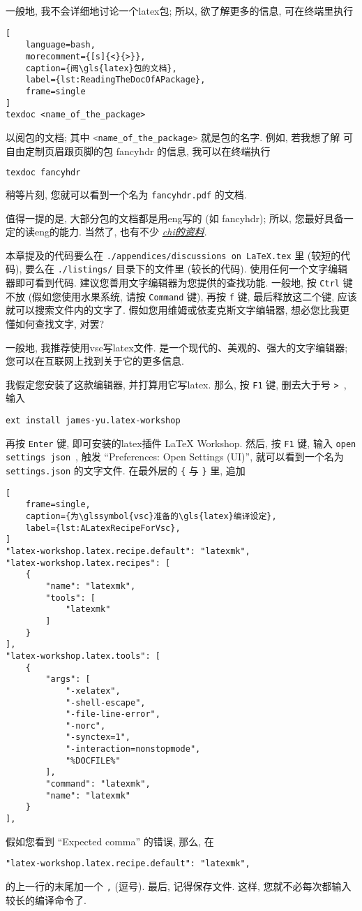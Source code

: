 一般地, 我不会详细地讨论一个\gls{latex}包;
所以, 欲了解更多的信息, 可在终端里执行
\begin{lstlisting}[
    language=bash,
    morecomment={[s]{<}{>}},
    caption={阅\gls{latex}包的文档},
    label={lst:ReadingTheDocOfAPackage},
    frame=single
]
texdoc <name_of_the_package>
\end{lstlisting}
以阅包的文档;
其中
\lstinline[language=bash,morecomment={[s]{<}{>}}]`<name_of_the_package>`
就是包的名字.
例如,
若我想了解%
可自由定制页眉跟页脚的包 \textsf{fancyhdr} 的信息,
我可以在终端执行
\begin{lstlisting}[language=bash,morecomment={[s]{<}{>}}]
texdoc fancyhdr
\end{lstlisting}
稍等片刻, 您就可以看到一个名为 \verb`fancyhdr.pdf` 的文档.

值得一提的是,
大部分包的文档都是用\gls{eng}写的 (如 \textsf{fancyhdr});
所以, 您最好具备一定的读\gls{eng}的能力.
当然了, 也有不少%
\href{https://ctan.org/topic/chinese-doc}{\emph{\gls{chi}的资料}}.

本章提及的代码要么在
\verb`./appendices/discussions on LaTeX.tex` 里 (较短的代码),
要么在 \verb`./listings/` 目录下的文件里 (较长的代码).
使用任何一个文字编辑器即可看到代码.
建议您善用文字编辑器为您提供的查找功能.
一般地, 按 \verb`Ctrl` 键不放
(假如您使用水果系统, 请按 \verb`Command` 键),
再按 \verb`f` 键, 最后释放这二个键,
应该就可以搜索文件内的文字了.
假如您用维姆或依麦克斯文字编辑器,
想必您比我更懂如何查找文字, 对罢?

一般地, 我推荐使用\gls{vsc}写\gls{latex}文件.
是一个现代的、美观的、强大的文字编辑器;
您可以在互联网上找到关于它的更多信息.

我假定您安装了这款编辑器, 并打算用它写\gls{latex}.
那么, 按 \verb`F1` 键, 删去大于号 \verb`>`~, 输入
\begin{lstlisting}
ext install james-yu.latex-workshop
\end{lstlisting}
再按 \verb`Enter` 键,
即可安装的\gls{latex}插件 LaTeX Workshop.
然后, 按 \verb`F1` 键, 输入 \verb`open settings json`~,
触发 ``Preferences: Open Settings (UI)'',
就可以看到一个名为 \verb`settings.json` 的文字文件.
在最外层的 \verb`{` 与 \verb`}` 里, 追加
\begin{lstlisting}[
    frame=single,
    caption={为\glssymbol{vsc}准备的\gls{latex}编译设定},
    label={lst:ALatexRecipeForVsc},
]
"latex-workshop.latex.recipe.default": "latexmk",
"latex-workshop.latex.recipes": [
    {
        "name": "latexmk",
        "tools": [
            "latexmk"
        ]
    }
],
"latex-workshop.latex.tools": [
    {
        "args": [
            "-xelatex",
            "-shell-escape",
            "-file-line-error",
            "-norc",
            "-synctex=1",
            "-interaction=nonstopmode",
            "%DOCFILE%"
        ],
        "command": "latexmk",
        "name": "latexmk"
    }
],
\end{lstlisting}
假如您看到 ``Expected comma'' 的错误, 那么, 在
\begin{lstlisting}
"latex-workshop.latex.recipe.default": "latexmk",
\end{lstlisting}
的上一行的末尾加一个 \verb`,` (逗号).
最后, 记得保存文件.
这样, 您就不必每次都输入较长的编译命令了.

